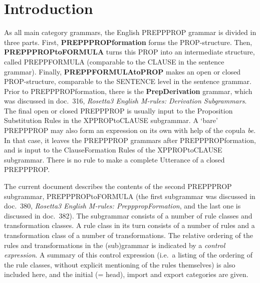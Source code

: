 
   \RosSupersedes{-}
   \MakeRosTitle
%
%

\section{Introduction}
As all main category grammars, the English PREPPPROP grammar is divided in 
three parts. First, {\bf PREPPPROPformation} forms the PROP-structure. Then, {
\bf PREPPPROPtoFORMULA} turns this PROP into an intermediate structure, called 
PREPPFORMULA
(comparable to the CLAUSE in the sentence grammar). Finally, {\bf 
PREPPFORMULAtoPROP} makes an open or closed PROP-structure, comparable to the 
SENTENCE level in the sentence grammar. Prior to PREPPPROPformation, there is 
the {\bf PrepDerivation} grammar, which was discussed in doc.\ 316, {\em 
Rosetta3 English M-rules: Derivation Subgrammars\/}. The final open or closed 
PREPPPROP is usually input to the Proposition Substitution Rules in the 
XPPROPtoCLAUSE subgrammar. A `bare' PREPPPROP may also form an expression on 
its own with help of the copula {\em be\/}. In that case, it leaves the 
PREPPPROP grammars after PREPPPROPformation, and 
is input to the ClauseFormation Rules of the XPPROPtoCLAUSE subgrammar. 
There is no rule to make a complete Utterance of a closed PREPPPROP.

The current document describes the contents of the second PREPPPROP subgrammar, 
PREPPPROPtoFORMULA (the first subgrammar was discussed in doc.\ 380, {\em 
Rosetta3 English M-rules: PrepppropFormation\/}, and the last one is discussed 
in doc.\ 382). The subgrammar consists of 
a number of rule classes and transformation classes. A rule class in its turn
consists of a number of rules and a transformation class of a number of 
transformations. The relative ordering of the rules and transformations in the
(sub)grammar is indicated by a {\em control expression}. A summary of this
control expression (i.e.\ a listing of the ordering of the rule classes, 
without explicit mentioning of the rules themselves) is also included here, 
and the initial (= head), import and export categories are given. 


